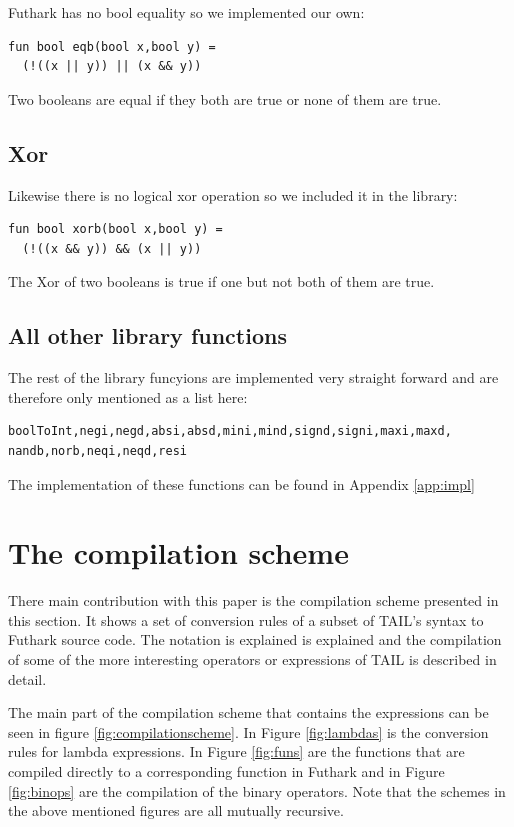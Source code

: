 \documentclass[11pt]{article}
\begin{document}
Futhark has no bool equality so we implemented our own:

\begin{lstlisting}[language=Futhark]
fun bool eqb(bool x,bool y) =
  (!((x || y)) || (x && y))
\end{lstlisting}

Two booleans are equal if they both are true or none of them are true.

\subsection{Xor} Likewise there is no logical xor operation so we included it in the library:

\begin{lstlisting}[language=Futhark]
fun bool xorb(bool x,bool y) =
  (!((x && y)) && (x || y))
\end{lstlisting}

The Xor of two booleans is true if one but not both of them are true.

\subsection{All other library functions}
The rest of the library funcyions are implemented very straight forward and are therefore only mentioned as a list here:

\begin{lstlisting}[numbers=none,frame=none]
boolToInt,negi,negd,absi,absd,mini,mind,signd,signi,maxi,maxd,
nandb,norb,neqi,neqd,resi
\end{lstlisting}
The implementation of these functions can be found in Appendix \ref{app:impl}

\section{The compilation scheme}
\label{sec:scheme}

There main contribution with this paper is the compilation scheme presented in this section.
It shows a set of conversion rules of a subset of TAIL's syntax to Futhark source code.
The notation is explained is explained and the compilation of some of the more interesting operators or expressions of TAIL is described in detail. 

The main part of the compilation scheme that contains the expressions can be seen in figure \ref{fig:compilationscheme}. In Figure \ref{fig:lambdas} is the conversion rules for lambda expressions. In Figure \ref{fig:funs} are the functions that are compiled directly to a corresponding function in Futhark and in Figure \ref{fig:binops} are the compilation of the binary operators. Note that the schemes in the above mentioned figures are all mutually recursive. 
\end{document}
